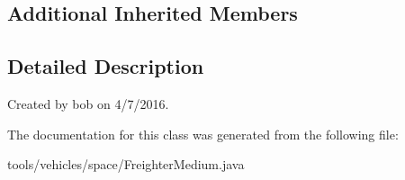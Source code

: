 \subsection*{Additional Inherited Members}


\subsection{Detailed Description}
Created by bob on 4/7/2016. 

The documentation for this class was generated from the following file\+:\begin{DoxyCompactItemize}
\item 
tools/vehicles/space/Freighter\+Medium.\+java\end{DoxyCompactItemize}
